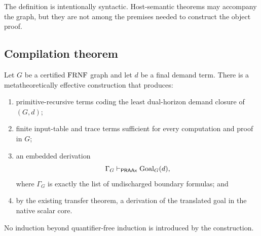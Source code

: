 The definition is intentionally syntactic.  Host-semantic theorems may accompany the
graph, but they are not among the premises needed to construct the object proof.

\subsection{Compilation theorem}

\begin{theorem}
\label{thm:frnf-compilation}
Let \(G\) be a certified \(\mathrm{FRNF}\) graph and let \(d\) be a final demand term.  There is
a metatheoretically effective construction that produces:

\begin{enumerate}[label=(\roman*),leftmargin=2.4em]
\item primitive-recursive terms coding the least dual-horizon demand closure of
\((G,d)\);
\item finite input-table and trace terms sufficient for every computation and proof in
\(G\);
\item an embedded derivation
\[
   \Gamma_G\vdash_{\mathsf{PRAAx}}\operatorname{Goal}_G(d),
\]
where \(\Gamma_G\) is exactly the list of undischarged boundary formulas; and
\item by the existing transfer theorem, a derivation of the translated goal in the
native scalar core.
\end{enumerate}
No induction beyond quantifier-free induction is introduced by the construction.
\end{theorem}

